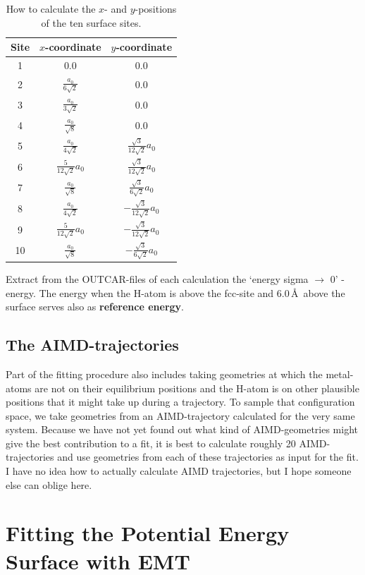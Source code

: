\documentclass[11pt,oneside,a4paper, captions=nooneline, headsepline]{article}%
\begin{document}
\begin{table}[h!]
\centering
\caption{How to calculate the $x$- and $y$-positions of the ten surface sites.}
\label{calsusi}
\begin{tabular}{ccc}
\hline\hline
Site&$x$-coordinate&$y$-coordinate\\
\hline
1&0.0						&0.0\\
2& $\frac{a_0}{6\sqrt{2}}$	&0.0\\
3& $\frac{a_0}{3\sqrt{2}}$	&0.0\\
4& $\frac{a_0}{\sqrt{8}}$	&0.0\\
5& $\frac{a_0}{4 \sqrt{2}}$	&$\frac{\sqrt{3}}{12\sqrt{2}}a_0$\\
6& $\frac{5}{12\sqrt{2}}a_0$&$\frac{\sqrt{3}}{12\sqrt{2}}a_0$\\
7& $\frac{a_0}{\sqrt{8}}$	&$\frac{\sqrt{3}}{6\sqrt{2}}a_0$\\
8& $\frac{a_0}{4\sqrt{2}}$	&$-\frac{\sqrt{3}}{12\sqrt{2}}a_0$\\
9& $\frac{5}{12\sqrt{2}}a_0$&$-\frac{\sqrt{3}}{12\sqrt{2}}a_0$\\
10&$\frac{a_0}{\sqrt{8}}$ 	&$-\frac{\sqrt{3}}{6\sqrt{2}}a_0$\\
\hline\hline
\end{tabular}
\end{table}\newline\noindent
Extract from the OUTCAR-files of each calculation the `energy sigma $\rightarrow$ 0' -energy. The energy when the H-atom is above the fcc-site and 6.0\,\AA~above the surface serves also as \textbf{reference energy}.
\subsection{The AIMD-trajectories}
Part of the fitting procedure also includes taking geometries at which the metal-atoms are not on their equilibrium positions and the H-atom is on other plausible positions that it might take up during a trajectory. To sample that configuration space, we take geometries from an AIMD-trajectory calculated for the very same system. Because we have not yet found out what kind of AIMD-geometries might give the best contribution to a fit, it is best to calculate roughly 20 AIMD-trajectories and use geometries from each of these trajectories as input for the fit.\\
I have no idea how to actually calculate AIMD trajectories, but I hope someone else can oblige here.

\section{Fitting the Potential Energy Surface with EMT}
\end{document}
